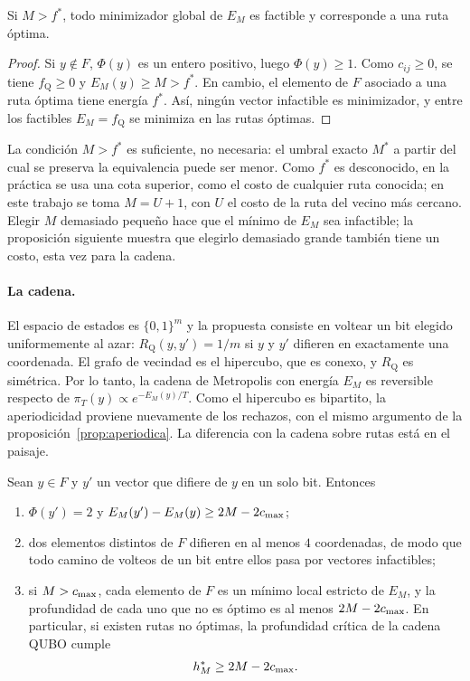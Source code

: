 \begin{proposicion}
\label{prop:equivalencia}
Si \(M>f^\ast\), todo minimizador global de \(E_M\) es factible y
corresponde a una ruta óptima.
\end{proposicion}

\begin{proof}
Si \(y\notin F\), \(\Phi(y)\) es un entero positivo, luego
\(\Phi(y)\ge1\). Como \(c_{ij}\ge0\), se tiene \(f_{\mathrm Q}\ge0\) y
\(E_M(y)\ge M>f^\ast\). En cambio, el elemento de \(F\) asociado a una
ruta óptima tiene energía \(f^\ast\). Así, ningún vector infactible es
minimizador, y entre los factibles \(E_M=f_{\mathrm Q}\) se minimiza en
las rutas óptimas.
\end{proof}

La condición \(M>f^\ast\) es suficiente, no necesaria: el umbral exacto
\(M^\ast\) a partir del cual se preserva la equivalencia puede ser
menor. Como \(f^\ast\) es desconocido, en la práctica se usa una cota
superior, como el costo de cualquier ruta conocida; en este trabajo se
toma \(M=U+1\), con \(U\) el costo de la ruta del vecino más cercano. Elegir \(M\)
demasiado pequeño hace que el mínimo de \(E_M\) sea infactible; la
proposición siguiente muestra que elegirlo demasiado grande también
tiene un costo, esta vez para la cadena.

\paragraph{La cadena.} El espacio de estados es \(\{0,1\}^m\) y la
propuesta consiste en voltear un bit elegido uniformemente al azar:
\(R_{\mathrm Q}(y,y')=1/m\) si \(y\) y \(y'\) difieren en exactamente una
coordenada. El grafo de vecindad es el hipercubo, que es conexo, y
\(R_{\mathrm Q}\) es simétrica. Por lo tanto, la cadena de Metropolis
con energía \(E_M\) es reversible respecto de
\(\pi_T(y)\propto e^{-E_M(y)/T}\). Como el hipercubo es bipartito, la
aperiodicidad proviene nuevamente de los rechazos, con el mismo
argumento de la proposición~\ref{prop:aperiodica}. La diferencia con la
cadena sobre rutas está en el paisaje.

\begin{proposicion}
\label{prop:barrera}
Sean \(y\in F\) y \(y'\) un vector que difiere de \(y\) en un solo bit.
Entonces
\begin{enumerate}[label=(\alph*)]
    \item \(\Phi(y')=2\) y
    \(E_M(y')-E_M(y)\ge 2M-2c_{\max}\);
    \item dos elementos distintos de \(F\) difieren en al menos \(4\)
    coordenadas, de modo que todo camino de volteos de un bit entre
    ellos pasa por vectores infactibles;
    \item si \(M>c_{\max}\), cada elemento de \(F\) es un mínimo local
    estricto de \(E_M\), y la profundidad de cada uno que no es óptimo
    es al menos \(2M-2c_{\max}\). En particular, si existen rutas no
    óptimas, la profundidad crítica de la cadena QUBO cumple
    \[
    h^\ast_M\ge 2M-2c_{\max} .
    \]
\end{enumerate}
\end{proposicion}

